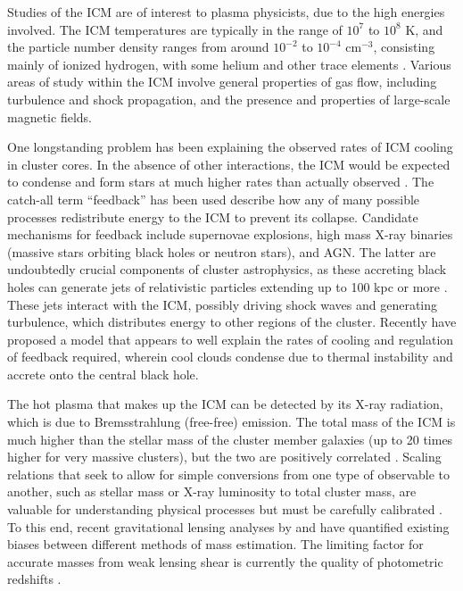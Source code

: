 Studies of the \ac{ICM} are of interest to plasma physicists, due to the high energies involved. The \ac{ICM} temperatures are typically in the range of $10^7$ to $10^8$ K, and the particle number density ranges from around $10^{-2}$ to $10^{-4}$ cm$^{-3}$, consisting mainly of ionized hydrogen, with some helium and other trace elements \citep{Markevitch07}. Various areas of study within the \ac{ICM} involve general properties of gas flow, including turbulence and shock propagation, and the presence and properties of large-scale magnetic fields. 

One longstanding problem has been explaining the observed rates of \ac{ICM} cooling in cluster cores. In the absence of other interactions, the \ac{ICM} would be expected to condense and form stars at much higher rates than actually observed \citep{Fabian94}. The catch-all term ``feedback'' has been used describe how any of many possible processes redistribute energy to the \ac{ICM} to prevent its collapse. Candidate mechanisms for feedback include supernovae explosions, high mass X-ray binaries (massive stars orbiting black holes or neutron stars), and \ac{AGN}. The latter are undoubtedly crucial components of cluster astrophysics, as these accreting black holes can generate jets of relativistic particles extending up to 100 kpc or more \citep{Fabian12}. These jets interact with the \ac{ICM}, possibly driving shock waves and generating turbulence, which distributes energy to other regions of the cluster. Recently \citet{Voit15} have proposed a model that appears to well explain the rates of cooling and regulation of feedback required, wherein cool clouds condense due to thermal instability and accrete onto the central black hole.

The hot plasma that makes up the \ac{ICM} can be detected by its X-ray radiation, which is due to Bremsstrahlung (free-free) emission. The total mass of the \ac{ICM} is much higher than the stellar mass of the cluster member galaxies (up to 20 times higher for very massive clusters), but the two are positively correlated \citep{Kravtsov12}. Scaling relations that seek to allow for simple conversions from one type of observable to another, such as stellar mass or X-ray luminosity to total cluster mass, are valuable for understanding physical processes but must be carefully calibrated \citep{Leauthaud10}. To this end, recent gravitational lensing analyses by \citet{Applegate14} and \citet{Hoekstra15} have quantified existing biases between different methods of mass estimation. The limiting factor for accurate masses from weak lensing shear is currently the quality of photometric redshifts \citep{Hoekstra15}.

